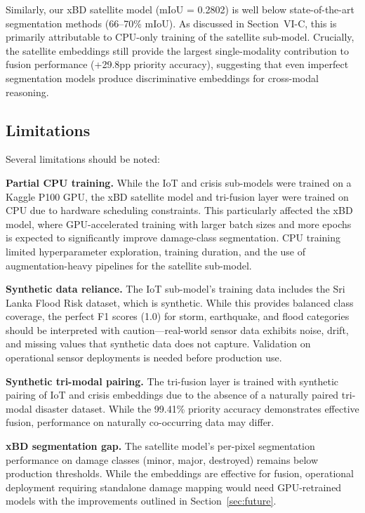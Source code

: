\documentclass[journal]{IEEEtran}
\begin{document}
Similarly, our xBD satellite model (mIoU = 0.2802) is well below state-of-the-art segmentation methods (66--70\% mIoU). As discussed in Section~VI-C, this is primarily attributable to CPU-only training of the satellite sub-model. Crucially, the satellite embeddings still provide the largest single-modality contribution to fusion performance (+29.8pp priority accuracy), suggesting that even imperfect segmentation models produce discriminative embeddings for cross-modal reasoning.

\subsection{Limitations}
\label{sec:limitations}

Several limitations should be noted:

\textbf{Partial CPU training.} While the IoT and crisis sub-models were trained on a Kaggle P100 GPU, the xBD satellite model and tri-fusion layer were trained on CPU due to hardware scheduling constraints. This particularly affected the xBD model, where GPU-accelerated training with larger batch sizes and more epochs is expected to significantly improve damage-class segmentation. CPU training limited hyperparameter exploration, training duration, and the use of augmentation-heavy pipelines for the satellite sub-model.

\textbf{Synthetic data reliance.} The IoT sub-model's training data includes the Sri Lanka Flood Risk dataset, which is synthetic. While this provides balanced class coverage, the perfect F1 scores (1.0) for storm, earthquake, and flood categories should be interpreted with caution---real-world sensor data exhibits noise, drift, and missing values that synthetic data does not capture. Validation on operational sensor deployments is needed before production use.

\textbf{Synthetic tri-modal pairing.} The tri-fusion layer is trained with synthetic pairing of IoT and crisis embeddings due to the absence of a naturally paired tri-modal disaster dataset. While the 99.41\% priority accuracy demonstrates effective fusion, performance on naturally co-occurring data may differ.

\textbf{xBD segmentation gap.} The satellite model's per-pixel segmentation performance on damage classes (minor, major, destroyed) remains below production thresholds. While the embeddings are effective for fusion, operational deployment requiring standalone damage mapping would need GPU-retrained models with the improvements outlined in Section~\ref{sec:future}.
\end{document}
